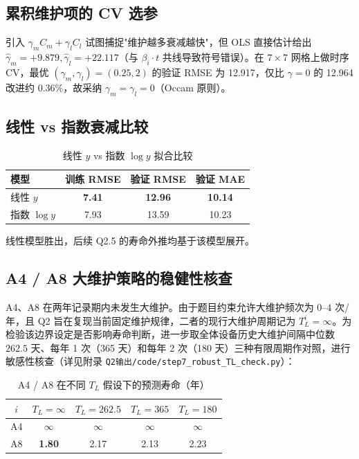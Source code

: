 \documentclass[12pt, a4paper, fontset=fandol]{ctexart}
\theoremstyle{definition}
\begin{document}
\subsection{累积维护项的 CV 选参}

引入 $\gamma_m C_m + \gamma_l C_l$ 试图捕捉"维护越多衰减越快"，但 OLS 直接估计给出 $\hat{\gamma}_m = +9.879, \hat{\gamma}_l = +22.117$（与 $\beta_i \cdot t$ 共线导致符号错误）。在 $7 \times 7$ 网格上做时序 CV，最优 $(\gamma_m, \gamma_l) = (0.25, 2)$ 的验证 RMSE 为 12.917，仅比 $\gamma = 0$ 的 12.964 改进约 0.36\%，故采纳 $\gamma_m = \gamma_l = 0$（Occam 原则）。

\subsection{线性 vs 指数衰减比较}

\begin{table}[H]
\centering
\caption{线性 $y$ vs 指数 $\log y$ 拟合比较}
\begin{tabular}{lccc}
\toprule
模型 & 训练 RMSE & 验证 RMSE & 验证 MAE \\
\midrule
线性 $y$    & \textbf{7.41} & \textbf{12.96} & \textbf{10.14} \\
指数 $\log y$ & 7.93 & 13.59 & 10.23 \\
\bottomrule
\end{tabular}
\end{table}

线性模型胜出，后续 Q2.5 的寿命外推均基于该模型展开。

\subsection{A4 / A8 大维护策略的稳健性核查}

A4、A8 在两年记录期内未发生大维护。由于题目约束允许大维护频次为 $0$--$4$ 次/年，且 Q2 旨在复现当前固定维护规律，二者的现行大维护周期记为 $T_L^i = \infty$。为检验该边界设定是否影响寿命判断，进一步取全体设备历史大维护间隔中位数 $262.5$ 天、每年 1 次（365 天）和每年 2 次（180 天）三种有限周期作对照，进行敏感性核查（详见附录 \texttt{Q2输出/code/step7\_robust\_TL\_check.py}）：

\begin{table}[H]
\centering
\caption{A4 / A8 在不同 $T_L$ 假设下的预测寿命（年）}
\begin{tabular}{ccccc}
\toprule
$i$ & $T_L = \infty$ & $T_L = 262.5$ & $T_L = 365$ & $T_L = 180$ \\
\midrule
A4 & $\infty$ & $\infty$ & $\infty$ & $\infty$ \\
A8 & \textbf{1.80} & 2.17 & 2.13 & 2.23 \\
\bottomrule
\end{tabular}
\end{table}
\end{document}

